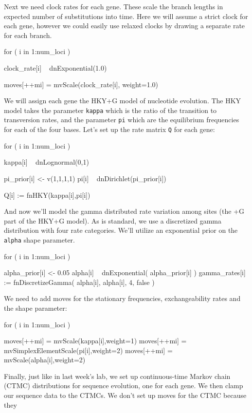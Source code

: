 \documentclass[11pt]{article}
\begin{document}
Next we need clock rates for each gene. 
These scale the branch lengths in expected number of substitutions
into time.
Here we will assume a strict clock for each gene,
however we could easily use relaxed clocks by
drawing a separate rate for each branch.
\begin{code}
for ( i in 1:num_loci ) {

   clock_rate[i] ~ dnExponential(1.0)

   moves[++mi] = mvScale(clock_rate[i], weight=1.0)
}
\end{code}
We will assign each gene the HKY+G
model of nucleotide evolution.
The HKY model takes the parameter \texttt{kappa}
which is the ratio of the transition to transversion rates,
and the parameter \texttt{pi} which
are the equilibrium frequencies for each of the four bases.
Let's set up the rate matrix \texttt{Q} for
each gene:
\begin{code}
for ( i in 1:num_loci ) {

    kappa[i] ~ dnLognormal(0,1)

    pi_prior[i] <- v(1,1,1,1)
    pi[i] ~ dnDirichlet(pi_prior[i])

    Q[i] := fnHKY(kappa[i],pi[i])

}
\end{code}
And now we'll model the gamma distributed rate variation among
sites (the +G part of the HKY+G model).
As is standard, we use a discretized gamma distribution
with four rate categories. We'll utilize an exponential
prior on the \texttt{alpha} shape parameter.
\begin{code}
for ( i in 1:num_loci ) {

    alpha_prior[i] <- 0.05
    alpha[i] ~ dnExponential( alpha_prior[i] )
    gamma_rates[i] := fnDiscretizeGamma( alpha[i], alpha[i], 4, false )

}
\end{code}
We need to add moves for 
the stationary frequencies, exchangeability rates and the shape parameter:
\begin{code}
for ( i in 1:num_loci ) {

    moves[++mi] = mvScale(kappa[i],weight=1)
    moves[++mi] = mvSimplexElementScale(pi[i],weight=2)
    moves[++mi] = mvScale(alpha[i],weight=2)

}
\end{code}
Finally, just like in last week's lab, 
we set up continuous-time Markov chain (CTMC) distributions
for sequence evolution, one for each gene.
We then clamp our sequence data to the CTMCs.
We don't set up moves for the CTMC because they
\end{document}

